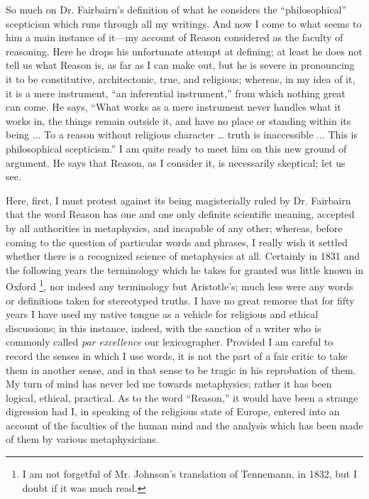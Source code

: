 
So much on Dr. Fairbairn's definition of what he
considers the ``philosophical'' scepticism which runs through all my
writings. And now I come to what seems to him a main instance of
it—my account of Reason considered as the faculty of reasoning. Here
he drops his unfortunate attempt at defining; at least he does not
tell us what Reason is, as far as I can make out, but he is severe in
pronouncing it to be constitutive, architectonic, true, and religious;
whereas, in my idea of it, it is a mere instrument, ``an inferential
instrument,'' from which nothing great can come. He says, ``What works
as a mere instrument never handles what it works in, the things remain
outside it, and have no place or standing within its being ... To a
reason without religious character … truth is inaccessible ... This
is philosophical scepticism.'' I am quite ready to meet him on this new
ground of argument. He says that Reason, as I consider it, is
necessarily skeptical; let us see.

Here, first, I must protest against its being
magisterially ruled by Dr. Fairbairn that the word Reason has one and
one only definite scientific meaning, accepted by all authorities in
metaphysics, and incapable of any other; whereas, before coming to the
question of particular words and phrases, I really wish it settled
whether there is a recognized science of metaphysics at all.
Certainly in 1831 and the following years the terminology which he
takes for granted was little known in Oxford \footnote{I am not
forgetful of Mr. Johnson's translation of Tennemann, in 1832, but I
doubt if it was much read.}, nor indeed any terminology but Aristotle's; much less were any
words or definitions taken for stereotyped truths. I have no great
remorse that for fifty years I have used my native tongue as a vehicle
for religious and ethical discussions; in this instance, indeed, with
the sanction of a writer who is commonly called \emph{par excellence}
our lexicographer. Provided I am careful to record the senses in which
I use words, it is not the part of a fair critic to take them in
another sense, and in that sense to be tragic in his reprobation of
them. My turn of mind has never led me towards metaphysics; rather it
has been logical, ethical, practical. As to the word ``Reason,'' it
would have been a strange digression had I, in speaking of the
religious state of Europe, entered into an account of the faculties of
the human mind and the analysis which has been made of them by various
metaphysicians.

